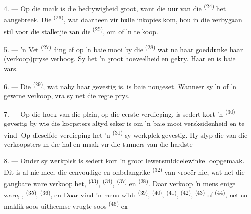 \VUsaut{4.0mm}
\VUsaut{3.0mm}

4. --- Op die mark is die bedrywigheid groot, want die uur van die 
\textsuperscript{(24)} het aangebreek. Die  \textsuperscript{(26)},
wat daarheen vir hulle inkopies kom, hou in die verbygaan stil voor die stalletjie van
die  \textsuperscript{(25)}, om  of 'n
 te koop.

5. --- 'n Vet  \textsuperscript{(27)} ding af op 'n baie mooi 
by die  \textsuperscript{(28)} wat na haar goeddunke haar
(verkoop)pryse verhoog. Sy het 'n groot hoeveelheid  en
 gekry. Haar  en  is baie vars.

\VUsaut{4.0mm}
\VUsaut{3.0mm}

6. --- Die  \textsuperscript{(29)}, wat naby haar gevestig
is, is baie nougeset. Wanneer sy 'n  of 'n gewone
 verkoop, vra sy net die regte prys.

7. --- Op die hoek van die plein, op die eerste verdieping, is sedert kort 'n
 \textsuperscript{(30)} gevestig by wie die koopsters altyd seker
is om 'n baie mooi verskeidenheid   en
 te vind. Op dieselfde verdieping het 'n 
\textsuperscript{(31)} sy werkplek gevestig. Hy slyp die  van die
verkoopsters in die hal en maak vir die tuiniers  van die hardste

\VUsaut{4.0mm}
\VUsaut{3.0mm}

8. --- Onder sy werkplek is sedert kort 'n groot lewensmiddelewinkel oopgemaak. Dit is
al nie meer die eenvoudige en onbelangrike 
\textsuperscript{(32)} van vroeër nie, wat net die gangbare ware verkoop het,
 \textsuperscript{(33)},  \textsuperscript{(34)},
 \textsuperscript{(37)} en  \textsuperscript{(38)}. Daar
verkoop 'n mens enige ware, , 
\textsuperscript{(35)},  \textsuperscript{(36)}, 
 en  Daar vind 'n mens wild:
 \textsuperscript{(39)},  \textsuperscript{(40)},
 \textsuperscript{(41)},  \textsuperscript{(42)},
 \textsuperscript{(43)} of  \textsuperscript{(44)}, net
so maklik soos uitheemse vrugte soos  \textsuperscript{(46)} en

